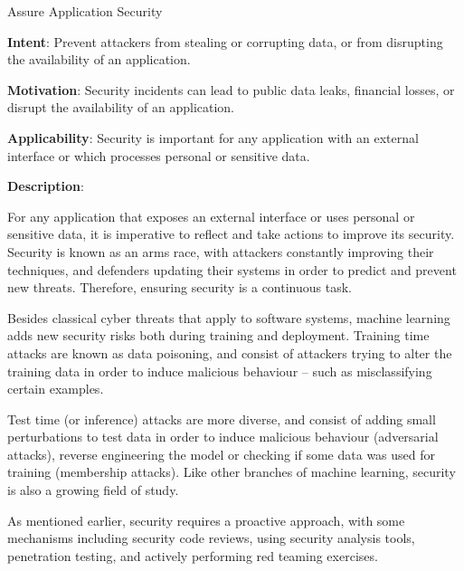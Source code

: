   
  \begin{frame}[plain]{ Assure Application Security
 }

  \textbf{Intent}: Prevent attackers from stealing or corrupting data, or from disrupting the availability of an application.  
 

  \textbf{Motivation}: Security incidents can lead to public data leaks, financial losses, or disrupt the availability of an application. 
 

  \textbf{Applicability}: Security is important for any application with an external interface or which processes personal or sensitive data. 
 

  \textbf{Description}: 

For any application that exposes an external interface or uses personal or sensitive data, it is imperative to reflect and take actions to improve its security.
Security is known as an arms race, with attackers constantly improving their techniques, and defenders updating their systems in order to predict and prevent new threats.
Therefore, ensuring security is a continuous task.


Besides classical cyber threats that apply to software systems, machine learning adds new security risks both during training and deployment.
Training time attacks are known as data poisoning, and consist of attackers trying to alter the training data in order to induce malicious behaviour -- such as misclassifying certain examples.


Test time (or inference) attacks are more diverse, and consist of adding small perturbations to test data in order to induce malicious behaviour (adversarial attacks), reverse engineering the model or checking if some data was used for training (membership attacks). Like other branches of machine learning, security is also a growing field of study.


As mentioned earlier, security requires a proactive approach, with some mechanisms including security code reviews, using security analysis tools, penetration testing, and actively performing red teaming exercises.


 


  \end{frame}

